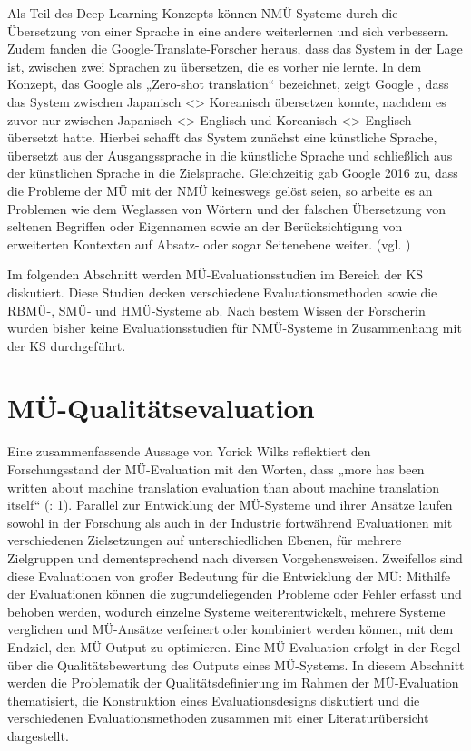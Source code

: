 Als Teil des Deep-Learning-Konzepts können NMÜ-Systeme durch die Übersetzung von einer Sprache in eine andere weiterlernen und sich verbessern. Zudem fanden die Google-Translate-Forscher heraus, dass das System in der Lage ist, zwischen zwei Sprachen zu übersetzen, die es vorher nie lernte. In dem Konzept, das Google als „Zero-shot translation“ bezeichnet, zeigt Google \citep{JohnsonEtAl2016}, dass das System zwischen Japanisch <> Koreanisch übersetzen konnte, nachdem es zuvor nur zwischen Japanisch <> Englisch und Koreanisch <> Englisch übersetzt hatte. Hierbei schafft das System zunächst eine künstliche Sprache, übersetzt aus der Ausgangssprache in die künstliche Sprache und schließlich aus der künstlichen Sprache in die Zielsprache. Gleichzeitig gab Google 2016 zu, dass die Probleme der MÜ mit der NMÜ keineswegs gelöst seien, so arbeite es an Problemen wie dem Weglassen von Wörtern und der falschen Übersetzung von seltenen Begriffen oder Eigennamen sowie an der Berücksichtigung von erweiterten Kontexten auf Absatz- oder sogar Seitenebene weiter. (vgl. \citealt{LeSchuster2016})

Im folgenden Abschnitt werden MÜ-Evaluationsstudien im Bereich der KS diskutiert. Diese Studien decken verschiedene Evaluationsmethoden sowie die RBMÜ-, SMÜ- und HMÜ-Systeme ab. Nach bestem Wissen der Forscherin wurden bisher keine Evaluationsstudien für NMÜ-Systeme in Zusammenhang mit der KS durchgeführt.

\section{\label{sec:3.3} MÜ-Qualitätsevaluation}

Eine zusammenfassende Aussage von Yorick Wilks reflektiert den Forschungsstand der MÜ-Evaluation mit den Worten, dass „more has been written about machine translation evaluation than about machine translation itself“ (\citealt{KingEtAl2003}: 1). Parallel zur Entwicklung der MÜ-Systeme und ihrer Ansätze laufen sowohl in der Forschung als auch in der Industrie fortwährend Evaluationen mit verschiedenen Zielsetzungen auf unterschiedlichen Ebenen, für mehrere Zielgruppen und dementsprechend nach diversen Vorgehensweisen. Zweifellos sind diese Evaluationen von großer Bedeutung für die Entwicklung der MÜ: Mithilfe der Evaluationen können die zugrundeliegenden Probleme oder Fehler erfasst und behoben werden, wodurch einzelne Systeme weiterentwickelt, mehrere Systeme verglichen und MÜ-Ansätze verfeinert oder kombiniert werden können, mit dem Endziel, den MÜ-Output zu optimieren. Eine MÜ-Evaluation erfolgt in der Regel über die Qualitätsbewertung des Outputs eines MÜ-Systems. In diesem Abschnitt werden die Problematik der Qualitätsdefinierung im Rahmen der MÜ-Evaluation thematisiert, die Konstruktion eines Evaluationsdesigns diskutiert und die verschiedenen Evaluationsmethoden zusammen mit einer Literaturübersicht dargestellt.

